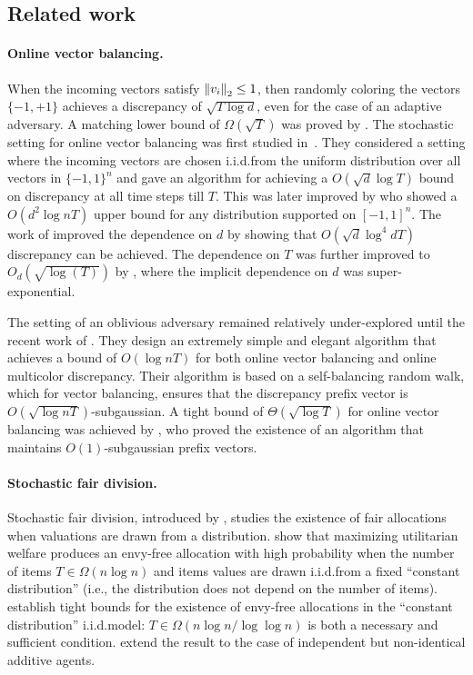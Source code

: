 \subsection{Related work}

\paragraph{Online vector balancing.}
    When the incoming vectors satisfy $\left\lVert v_i\right\rVert_2 \leq 1$, then randomly coloring the vectors $\{-1,+1\}$ achieves a discrepancy of $\sqrt{T \log{d}}$, even for the case of an adaptive adversary. A  matching lower bound of $\Omega(\sqrt{T})$ was proved by \citet{spencer1977balancing,spencer1994ten}. The stochastic setting for online vector balancing was first studied in~\cite{bansal2020line}. They considered a setting where the incoming vectors are chosen i.i.d.\@ from the uniform distribution over all vectors in $\{-1,1\}^n$ and gave an algorithm for achieving a $O(\sqrt{d}\log{T})$ bound on discrepancy at all time steps till $T$. This was later improved by \citet{bansal2020online} who showed a $O(d^2 \log{nT})$ upper bound for any distribution supported on $[-1,1]^n$. The work of \citet{bansal2021online} improved the dependence on $d$ by showing that $O(\sqrt{d}\log^4{dT})$ discrepancy can be achieved. The dependence on $T$ was further improved to $O_d(\sqrt{\log(T)})$ by \citet{aru2016balancing}, where the implicit dependence on $d$ was super-exponential. 
    
    The setting of an oblivious adversary remained relatively under-explored until the recent work of \citet{alweiss2021discrepancy}. They design an extremely simple and elegant algorithm that achieves a bound of $O(\log{nT})$ for both online vector balancing and online multicolor discrepancy. Their algorithm is based on a self-balancing random walk, which for vector balancing, ensures that the discrepancy prefix vector is $O(\sqrt{\log{nT}})$-subgaussian. A tight bound of $\Theta(\sqrt{\log{T}})$ for online vector balancing was achieved by \citet{kulkarni2024optimal}, who proved the existence of an algorithm that maintains $O(1)$-subgaussian prefix vectors.


\paragraph{Stochastic fair division.}

Stochastic fair division, introduced by \citet{dickerson2014computational}, studies the existence of fair allocations when valuations are drawn from a distribution. \citeauthor{dickerson2014computational} show that maximizing utilitarian welfare produces an envy-free allocation with high probability when the number of items $T \in \Omega(n \log n)$ and items values are drawn i.i.d.\@ from a fixed ``constant distribution'' (i.e., the distribution does not depend on the number of items). \citet{manurangsi2020envy,manurangsi2021closing} establish tight bounds for the existence of envy-free allocations in the ``constant distribution'' i.i.d.\@ model: $T \in \Omega (n \log n / \log \log n )$ is both a necessary and sufficient condition. \citet{bai2021envy} extend the result to the case of independent but non-identical additive agents.

